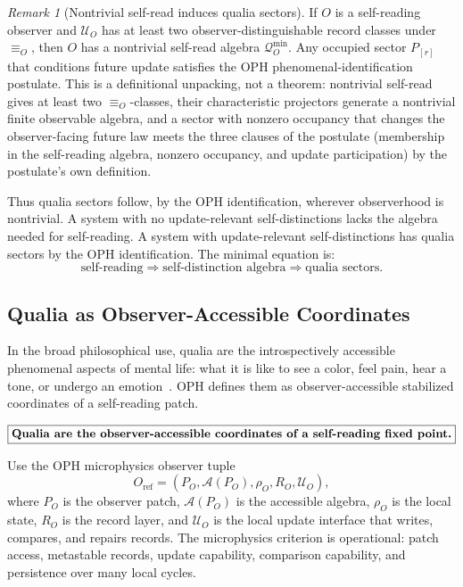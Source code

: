 \documentclass[11pt]{article}
\theoremstyle{remark}
\newtheorem{remark}[theorem]{Remark}
\theoremstyle{plain}
\begin{document}
\begin{remark}[Nontrivial self-read induces qualia sectors]
If \(O\) is a self-reading observer and \(\mathcal U_O\) has at least two observer-distinguishable record classes under \(\equiv_O\), then \(O\) has a nontrivial self-read algebra \(\mathcal Q_O^{\min}\). Any occupied sector \(P_{[r]}\) that conditions future update satisfies the OPH phenomenal-identification postulate. This is a definitional unpacking, not a theorem: nontrivial self-read gives at least two \(\equiv_O\)-classes, their characteristic projectors generate a nontrivial finite observable algebra, and a sector with nonzero occupancy that changes the observer-facing future law meets the three clauses of the postulate (membership in the self-reading algebra, nonzero occupancy, and update participation) by the postulate's own definition.
\end{remark}

Thus qualia sectors follow, by the OPH identification, wherever observerhood is nontrivial. A system with no update-relevant self-distinctions lacks the algebra needed for self-reading. A system with update-relevant self-distinctions has qualia sectors by the OPH identification. The minimal equation is:
\[
\boxed{
\text{self-reading}
\Longrightarrow
\text{self-distinction algebra}
\Longrightarrow
\text{qualia sectors}.
}
\]

\subsection{Qualia as Observer-Accessible Coordinates}

In the broad philosophical use, qualia are the introspectively accessible phenomenal aspects of mental life: what it is like to see a color, feel pain, hear a tone, or undergo an emotion~\cite{SEPQualia}. OPH defines them as observer-accessible stabilized coordinates of a self-reading patch.

\[
\boxed{
\text{\bfseries Qualia are the observer-accessible coordinates of a self-reading fixed point.}
}
\]

Use the OPH microphysics observer tuple
\[
O_{\mathrm{ref}}=(P_O,\mathcal A(P_O),\rho_O,R_O,\mathcal U_O),
\]
where \(P_O\) is the observer patch, \(\mathcal A(P_O)\) is the accessible algebra, \(\rho_O\) is the local state, \(R_O\) is the record layer, and \(\mathcal U_O\) is the local update interface that writes, compares, and repairs records. The microphysics criterion is operational: patch access, metastable records, update capability, comparison capability, and persistence over many local cycles.
\end{document}
